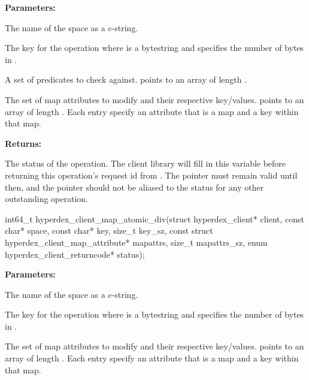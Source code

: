 \noindent\textbf{Parameters:}
\begin{description}[labelindent=\widthof{{\code{mapattrs}, \code{mapattrs\_sz}}},leftmargin=*,noitemsep,nolistsep,align=right]
\item[\code{space}] The name of the space as a c-string.
\item[\code{key}, \code{key\_sz}] The key for the operation where  is a bytestring and  specifies the number of bytes in .
\item[\code{checks}, \code{checks\_sz}] A set of predicates to check against.   points to an array of length .
\item[\code{mapattrs}, \code{mapattrs\_sz}] The set of map attributes to modify and their respective key/values.   points to an array of length .  Each entry specify an attribute that is a map and a key within that map.
\end{description}

\noindent\textbf{Returns:}
\begin{description}[labelindent=\widthof{{\code{status}}},leftmargin=*,noitemsep,nolistsep,align=right]
\item[\code{status}] The status of the operation.  The client library will fill in this variable before returning this operation's request id from .  The pointer must remain valid until then, and the pointer should not be aliased to the status for any other outstanding operation.
\end{description}

\funcsep
{}
\begin{ccode}
int64_t hyperdex_client_map_atomic_div(struct hyperdex_client* client,
                const char* space,
                const char* key, size_t key_sz,
                const struct hyperdex_client_map_attribute* mapattrs, size_t mapattrs_sz,
                enum hyperdex_client_returncode* status);
\end{ccode}
\funcdesc 

\noindent\textbf{Parameters:}
\begin{description}[labelindent=\widthof{{\code{mapattrs}, \code{mapattrs\_sz}}},leftmargin=*,noitemsep,nolistsep,align=right]
\item[\code{space}] The name of the space as a c-string.
\item[\code{key}, \code{key\_sz}] The key for the operation where  is a bytestring and  specifies the number of bytes in .
\item[\code{mapattrs}, \code{mapattrs\_sz}] The set of map attributes to modify and their respective key/values.   points to an array of length .  Each entry specify an attribute that is a map and a key within that map.
\end{description}

